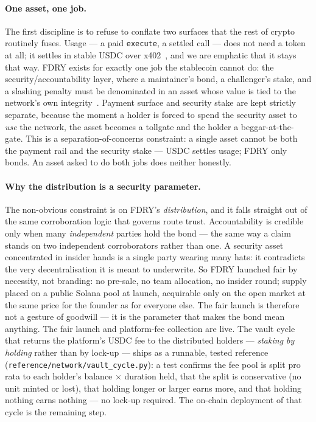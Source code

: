 \documentclass[11pt]{article}
\begin{document}
\paragraph{One asset, one job.} The first discipline is to refuse to conflate two
surfaces that the rest of crypto routinely fuses. Usage --- a paid
\texttt{execute}, a settled call --- does not need a token at all; it settles in
stable USDC over x402~\cite{x402}, and we are emphatic that it stays that way. FDRY
exists for exactly one job the stablecoin cannot do: the security/accountability
layer, where a maintainer's bond, a challenger's stake, and a slashing penalty must
be denominated in an asset whose value is tied to the network's own
integrity~\cite{security}. Payment surface and security stake are kept strictly
separate, because the moment a holder is forced to spend the security asset to
\emph{use} the network, the asset becomes a tollgate and the holder a
beggar-at-the-gate. This is a separation-of-concerns constraint: a single asset
cannot be both the payment rail and the security stake --- USDC settles usage; FDRY
only bonds. An asset asked to do both jobs does neither honestly.

\paragraph{Why the distribution is a security parameter.} The non-obvious constraint
is on FDRY's \emph{distribution}, and it falls straight out of the same corroboration
logic that governs route trust. Accountability is credible only when many
\emph{independent} parties hold the bond --- the same way a claim stands on two
independent corroborators rather than one. A security asset concentrated in insider
hands is a single party wearing many hats: it contradicts the very
decentralisation it is meant to underwrite. So FDRY launched fair by necessity, not
branding: no pre-sale, no team allocation, no insider round; supply placed on a
public Solana pool at launch, acquirable only on the open market at the same price
for the founder as for everyone else. The fair launch is therefore not a gesture of
goodwill --- it is the parameter that makes the bond mean anything. The fair launch
and platform-fee collection are live. The vault cycle that returns the platform's
USDC fee to the distributed holders --- \emph{staking by holding} rather than by
lock-up --- ships as a runnable, tested reference
(\texttt{reference/network/vault\_cycle.py}): a test confirms the fee
pool is split pro rata to each holder's balance $\times$ duration held, that the
split is conservative (no unit minted or lost), that holding longer or larger earns
more, and that holding nothing earns nothing --- no lock-up required. The on-chain
deployment of that cycle is the remaining step.
\end{document}
